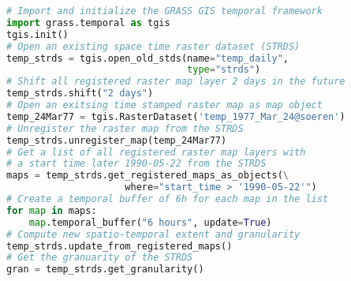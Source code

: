 \documentclass{standalone}
\begin{document}
\begin{lstlisting}[language=Python,linewidth=34.2em]
# Import and initialize the GRASS GIS temporal framework
import grass.temporal as tgis
tgis.init()
# Open an existing space time raster dataset (STRDS)
temp_strds = tgis.open_old_stds(name="temp_daily", 
                                type="strds")
# Shift all registered raster map layer 2 days in the future
temp_strds.shift("2 days")
# Open an exitsing time stamped raster map as map object
temp_24Mar77 = tgis.RasterDataset('temp_1977_Mar_24@soeren')
# Unregister the raster map from the STRDS
temp_strds.unregister_map(temp_24Mar77)
# Get a list of all registered raster map layers with
# a start time later 1990-05-22 from the STRDS
maps = temp_strds.get_registered_maps_as_objects(\
                     where="start_time > '1990-05-22'")
# Create a temporal buffer of 6h for each map in the list
for map in maps:
    map.temporal_buffer("6 hours", update=True)
# Compute new spatio-temporal extent and granularity 
temp_strds.update_from_registered_maps()
# Get the granuarity of the STRDS
gran = temp_strds.get_granularity()
\end{lstlisting}
\end{document}
